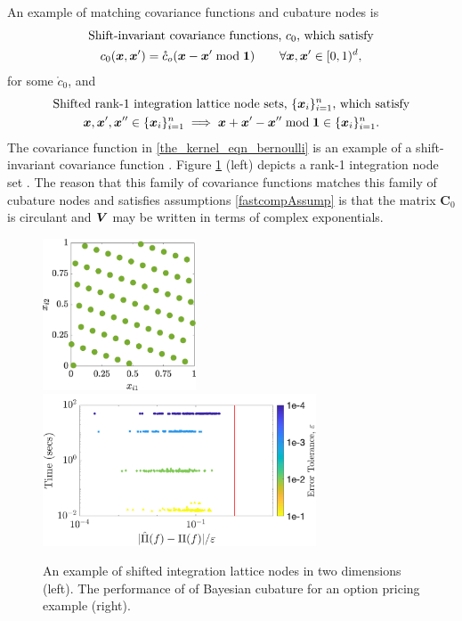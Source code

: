 \documentclass[sts]{imsart}
\numberwithin{equation}{section}
\theoremstyle{plain}
\newcommand{\vC}{\boldsymbol{C}}
\begin{document}
An example of matching covariance functions and cubature nodes is 
\begin{multline*}
    \text{Shift-invariant covariance functions, $c_0$, which satisfy}  \\ 
    c_0(\vx, \vx') = \mathring{c}_o(\vx - \vx' \bmod \vone) \qquad \forall \vx, \vx' \in [0,1)^d,
\end{multline*}
for some $\mathring{c}_0$, and
\begin{multline*}
    \text{Shifted rank-1 integration lattice node sets, $\{\vx_i\}_{i=1}^n$, which satisfy} \\
    \vx, \vx' , \vx'' \in \{\vx_i\}_{i=1}^n \implies \vx + \vx' - \vx'' \bmod \vone \in \{\vx_i\}_{i=1}^n. 
\end{multline*}
The covariance function in \eqref{the_kernel_eqn_bernoulli} is an example of a shift-invariant covariance function \citep{Hic98b}.  Figure \ref{fig:latfig} (left) depicts a rank-1 integration node set \cite{SloJoe94,DicEtal14a}.  The reason that this family of covariance functions matches this family of cubature nodes and satisfies assumptions \eqref{fastcompAssump} is that the matrix $\vC_0$ is circulant and $\boldsymbol{V}$ may be written in terms of complex exponentials.
\begin{figure}
    \centering
    \includegraphics[height = 4.5cm]{ShiftedLatticePoints.eps} \qquad	
    \includegraphics[height = 4.5cm]{"optPrice_guaranteed_time_full_Baker_d12_r1_2018-Sep-6"}
    \caption{An example of shifted integration lattice nodes in two dimensions (left). The performance of of Bayesian cubature for an option pricing example (right).}
    \label{fig:latfig}
\end{figure}
\end{document}
